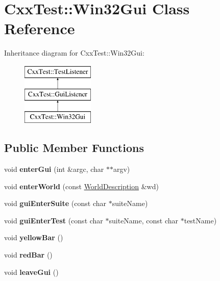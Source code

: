 \hypertarget{classCxxTest_1_1Win32Gui}{\section{Cxx\-Test\-:\-:Win32\-Gui Class Reference}
\label{classCxxTest_1_1Win32Gui}
}
Inheritance diagram for Cxx\-Test\-:\-:Win32\-Gui\-:\begin{figure}[H]
\begin{center}
\leavevmode
\includegraphics[height=3.000000cm]{classCxxTest_1_1Win32Gui}
\end{center}
\end{figure}
\subsection*{Public Member Functions}
\begin{DoxyCompactItemize}
\item 
\hypertarget{classCxxTest_1_1Win32Gui_a6e55bf95d71d80e5dd835476b102efac}{void {\bfseries enter\-Gui} (int \&argc, char $\ast$$\ast$argv)}\label{classCxxTest_1_1Win32Gui_a6e55bf95d71d80e5dd835476b102efac}

\item 
\hypertarget{classCxxTest_1_1Win32Gui_a6ace75b735224e8593de343b820760dc}{void {\bfseries enter\-World} (const \hyperlink{classCxxTest_1_1WorldDescription}{World\-Description} \&wd)}\label{classCxxTest_1_1Win32Gui_a6ace75b735224e8593de343b820760dc}

\item 
\hypertarget{classCxxTest_1_1Win32Gui_a84ec6040c2afe575c497cf51d9b4156a}{void {\bfseries gui\-Enter\-Suite} (const char $\ast$suite\-Name)}\label{classCxxTest_1_1Win32Gui_a84ec6040c2afe575c497cf51d9b4156a}

\item 
\hypertarget{classCxxTest_1_1Win32Gui_a8df332e1a263b0e158cd99c74bdc7648}{void {\bfseries gui\-Enter\-Test} (const char $\ast$suite\-Name, const char $\ast$test\-Name)}\label{classCxxTest_1_1Win32Gui_a8df332e1a263b0e158cd99c74bdc7648}

\item 
\hypertarget{classCxxTest_1_1Win32Gui_ad6f1da6e5f92b5550d15c089e2a5cbe4}{void {\bfseries yellow\-Bar} ()}\label{classCxxTest_1_1Win32Gui_ad6f1da6e5f92b5550d15c089e2a5cbe4}

\item 
\hypertarget{classCxxTest_1_1Win32Gui_ac8e2ea92c33d5f20ffe7f9426c8d519d}{void {\bfseries red\-Bar} ()}\label{classCxxTest_1_1Win32Gui_ac8e2ea92c33d5f20ffe7f9426c8d519d}

\item 
\hypertarget{classCxxTest_1_1Win32Gui_a495912f4f1f3fb84030d14763706f9fb}{void {\bfseries leave\-Gui} ()}\label{classCxxTest_1_1Win32Gui_a495912f4f1f3fb84030d14763706f9fb}

\end{DoxyCompactItemize}
